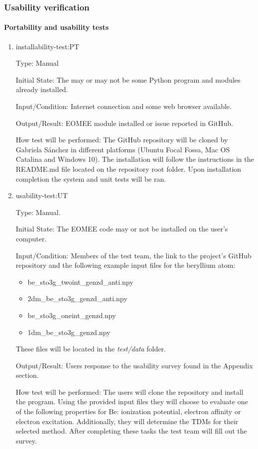 \documentclass[12pt, titlepage]{article}
\begin{document}
\subsubsection{Usability verification}
\label{section:usability}

\paragraph{Portability and usability tests}

\begin{enumerate}
	
	\item{installability-test:PT}
	
	Type: Manual
	
	Initial State: The may or may not be some Python program and modules 
	already installed.
	
	Input/Condition: Internet connection and some web browser available.
	
	Output/Result: EOMEE module installed or issue reported in GitHub.
	
	How test will be performed: 
	The GitHub repository will be cloned by Gabriela S\'anchez in different 
	platforms (Ubuntu Focal 
	Fossa, Mac OS Catalina and Windows 10). The installation will follow the 
	instructions in the README.md file located on the repository root folder. 
	Upon installation completion the system and unit tests will be ran. 

	\item{usability-test:UT\\}
	\label{sec:usability}
	
	Type: Manual.
	
	Initial State: The EOMEE code may or not be installed on the user's 
	computer.
	
	Input/Condition: Members of the test team, the link to the project's GitHub 
	repository and the following example input files for the beryllium atom:
	\begin{itemize}
		\item be\_sto3g\_twoint\_genzd\_anti.npy
		\item 2dm\_be\_sto3g\_genzd\_anti.npy
		\item be\_sto3g\_oneint\_genzd.npy
		\item 1dm\_be\_sto3g\_genzd.npy
	\end{itemize}
	These files will be located in the \textit{test/data} folder.
	
	Output/Result: Users response to the usability survey found in the Appendix 
	section.
	
	How test will be performed: The users will clone the repository and install 
	the program. Using the provided input files they will choose to evaluate 
	one of the following properties for Be: ionization potential, electron 
	affinity or electron excitation. Additionally, they will determine the TDMs 
	for their selected method. After completing these tasks the test team will 
	fill out the survey.
	
	
\end{enumerate}
\end{document}
